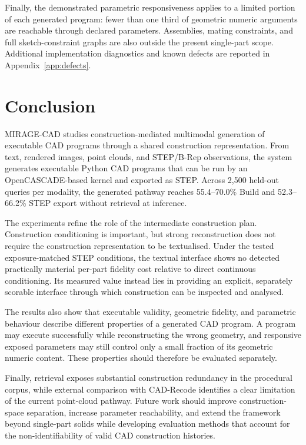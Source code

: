 \documentclass[preprint,12pt]{elsarticle}
\begin{document}
Finally, the demonstrated parametric responsiveness applies to a limited
portion of each generated program: fewer than one third of geometric numeric
arguments are reachable through declared parameters. Assemblies, mating
constraints, and full sketch-constraint graphs are also outside the present
single-part scope. Additional implementation diagnostics and known defects are reported in
Appendix~\ref{app:defects}.


\section{Conclusion}
\label{sec:conclusion}

MIRAGE-CAD studies construction-mediated multimodal generation of executable
CAD programs through a shared construction representation. From text, rendered images, point clouds, and
STEP/B-Rep observations, the system generates executable Python CAD programs
that can be run by an OpenCASCADE-based kernel and exported as STEP. Across
2,500 held-out queries per modality, the generated pathway reaches
55.4--70.0\% Build and 52.3--66.2\% STEP export without retrieval at
inference.

The experiments refine the role of the intermediate construction plan.
Construction conditioning is important, but strong reconstruction does not
require the construction representation to be textualised. Under the tested
exposure-matched STEP conditions, the textual interface shows no detected
practically material per-part fidelity cost relative to direct continuous
conditioning. Its measured value instead lies in providing an explicit,
separately scorable interface through which construction can be inspected and
analysed.

The results also show that executable validity, geometric fidelity, and
parametric behaviour describe different properties of a generated CAD
program. A program may execute successfully while reconstructing the wrong
geometry, and responsive exposed parameters may still control only a small
fraction of its geometric numeric content. These properties should therefore
be evaluated separately.

Finally, retrieval exposes substantial construction redundancy in the
procedural corpus, while external comparison with CAD-Recode
\cite{rukhovich2025cadrecode} identifies a clear limitation of the current
point-cloud pathway. Future work should improve construction-space separation,
increase parameter reachability, and extend the framework beyond single-part
solids while developing evaluation methods that account for the
non-identifiability of valid CAD construction histories.
\end{document}
